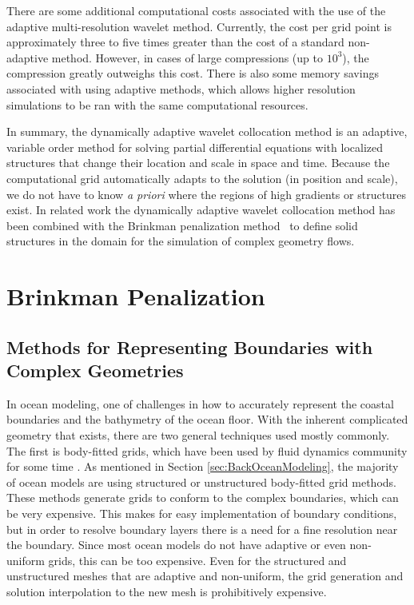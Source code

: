 There are some additional computational costs associated with the use of the adaptive multi-resolution wavelet method.  Currently, the cost per grid point is approximately three to five times greater than the cost of a standard non-adaptive method.  However, in cases of large compressions \cite{05KV} (up to $10^{3}$), the compression greatly outweighs this cost.  There is also some memory savings associated with using adaptive methods, which allows higher resolution simulations to be ran with the same computational resources.  

In summary, the dynamically adaptive wavelet collocation method is an adaptive, variable order method for solving partial differential equations with localized structures that change their location and scale in space and time.  Because the computational grid automatically adapts to the solution (in position and scale), we do not have to know {\it a priori\/} where the  regions of high gradients or structures exist. In related work the dynamically adaptive wavelet collocation method has been combined with the Brinkman penalization method~\cite{kevlahan-vasilyev:2005,kevlahan-ghidaglia:2001} to define solid structures in the domain for the simulation of complex geometry flows.

\section{Brinkman Penalization}

\subsection{Methods for Representing Boundaries with Complex Geometries}

In ocean modeling, one of challenges in how to accurately represent the coastal boundaries and the bathymetry of the ocean floor.  With the inherent complicated geometry that exists, there are two general techniques used mostly commonly.  The first is body-fitted grids, which have been used by fluid dynamics community for some time \cite{82TWM, 90Mavri}.  As mentioned in Section \ref{sec:BackOceanModeling}, the majority of ocean models are using structured or unstructured body-fitted grid methods.  These methods generate grids to conform to the complex boundaries, which can be very expensive.  This makes for easy implementation of boundary conditions, but in order to resolve boundary layers there is a need for a fine resolution near the boundary.  Since most ocean models do not have adaptive or even non-uniform grids, this can be too expensive.  Even for the structured and unstructured meshes that are adaptive and non-uniform, the grid generation and solution interpolation to the new mesh is prohibitively expensive.    

